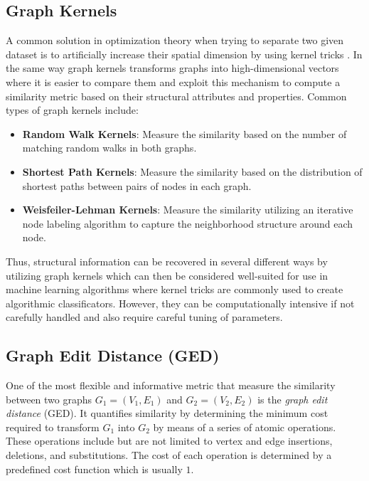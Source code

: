 \documentclass[../Thesis.tex]{subfiles}
\begin{document}
	
	
	\subsection{Graph Kernels}
	
	A common solution in optimization theory when trying to separate two given dataset is to artificially increase their spatial dimension by using kernel tricks \cite{kerneltrick}. In the same way graph kernels transforms graphs into high-dimensional vectors where it is easier to compare them and exploit this mechanism to compute a similarity metric based on their structural attributes and properties. Common types of graph kernels include:
	
	\begin{itemize}
		\item \textbf{Random Walk Kernels}: Measure the similarity based on the number of matching random walks in both graphs.
		\item \textbf{Shortest Path Kernels}: Measure the similarity based on the distribution of shortest paths between pairs of nodes in each graph.
		\item \textbf{Weisfeiler-Lehman Kernels}: Measure the similarity utilizing an iterative node labeling algorithm to capture the neighborhood structure around each node.
	\end{itemize}
	
	Thus, structural information can be recovered in several different ways by utilizing graph kernels which can then be considered well-suited for use in machine learning algorithms where kernel tricks are commonly used to create algorithmic classificators. However, they can be computationally intensive if not carefully handled and also require careful tuning of parameters.
	
	
	
	\subsection{Graph Edit Distance (GED)}
	
	One of the most flexible and informative metric that measure the similarity between two graphs $G_1 = (V_1, E_1)$ and $G_2 = (V_2, E_2)$ is the \emph{graph edit distance} (GED). It quantifies similarity by determining the minimum cost required to transform $G_1$ into $G_2$ by means of a series of atomic operations. These operations include but are not limited to vertex and edge insertions, deletions, and substitutions. The cost of each operation is determined by a predefined cost function which is usually $1$.
	
\end{document}
